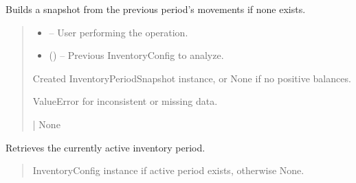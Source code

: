 \documentclass[a4paper,11pt,spanish]{sphinxmanual}
\begin{document}
\begin{fulllineitems}
\label{\detokenize{api/inventory/inventory.services:inventory.services.construir_snapshot_desde_movimientos_periodo}}
\pysigstartsignatures
\pysiglinewithargsret
{}
{\sphinxparamcomma {}}
{}
\pysigstopsignatures
\sphinxAtStartPar
Builds a snapshot from the previous period’s movements if none exists.
\begin{quote}\begin{description}
\begin{itemize}
\item {} 
\sphinxAtStartPar
{} – User performing the operation.

\item {} 
\sphinxAtStartPar
{} ({\hyperref[\detokenize{api/inventory/inventory.models:inventory.models.InventoryConfig}]{}}) – Previous InventoryConfig to analyze.

\end{itemize}

\sphinxAtStartPar
Created InventoryPeriodSnapshot instance, or None if no positive balances.

\sphinxAtStartPar
ValueError for inconsistent or missing data.

\sphinxAtStartPar
{\hyperref[\detokenize{api/inventory/inventory.models:inventory.models.InventoryPeriodSnapshot}]{}} | None

\end{description}\end{quote}

\end{fulllineitems}


\begin{fulllineitems}
\label{\detokenize{api/inventory/inventory.services:inventory.services.get_active_period}}
\pysigstartsignatures
\pysiglinewithargsret
{}
{}
{}
\pysigstopsignatures
\sphinxAtStartPar
Retrieves the currently active inventory period.
\begin{quote}\begin{description}
\sphinxAtStartPar
InventoryConfig instance if active period exists, otherwise None.

\end{description}\end{quote}

\end{fulllineitems}
\end{document}
